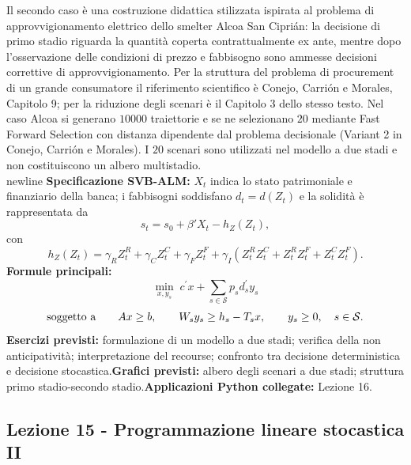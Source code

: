 \documentclass[12pt,a4paper]{article}%
\newcommand{\1}{\mathbf{1}}
\begin{document}
Il secondo caso \`e una costruzione didattica stilizzata
ispirata al problema di approvvigionamento elettrico dello smelter Alcoa
San Cipri\'{a}n: la decisione di primo stadio riguarda la quantit\`a coperta
contrattualmente ex ante, mentre dopo l'osservazione delle condizioni di
prezzo e fabbisogno sono ammesse decisioni correttive di approvvigionamento.
Per la struttura del problema di procurement di un grande consumatore il
riferimento scientifico \`e Conejo, Carri\'{o}n e Morales, Capitolo 9; per la
riduzione degli scenari \`e il Capitolo 3 dello stesso testo. Nel caso Alcoa
si generano $10000$ traiettorie e se ne selezionano $20$ mediante Fast
Forward Selection con distanza dipendente dal problema decisionale
(Variant 2 in Conejo, Carri\'{o}n e Morales). I $20$ scenari sono utilizzati
nel modello a due stadi e non costituiscono un albero multistadio.\\newline
\newline\textbf{Specificazione SVB-ALM:} $X_t$ indica lo stato patrimoniale e
finanziario della banca; i fabbisogni soddisfano $d_t=d(Z_t)$ e la solidit\`a
\`e rappresentata da
\[
s_t=s_0+\beta'X_t-h_Z(Z_t),
\]
con
\[
h_Z(Z_t)=
\gamma_R Z_t^R+\gamma_C Z_t^C+\gamma_F Z_t^F
+\gamma_I\left(
Z_t^RZ_t^C+Z_t^RZ_t^F+Z_t^CZ_t^F
\right).
\]
\newline\textbf{Formule
principali:}
\[
\min_{x,y_{s}}\; c^{\prime}x+\sum_{s\in\mathcal{S}}p_{s} d_{s}^{\prime}y_{s}
\]
\[
\hbox{soggetto a} \qquad Ax\geq b, \qquad W_{s} y_{s}\geq h_{s}-T_{s}x, \qquad
y_{s}\geq0, \quad s\in\mathcal{S}.
\]
\textbf{Esercizi previsti:} formulazione di un modello a due stadi; verifica
della non anticipativit\`{a}; interpretazione del recourse; confronto tra
decisione deterministica e decisione stocastica.\newline\textbf{Grafici
previsti:} albero degli scenari a due stadi; struttura primo stadio-secondo
stadio.\newline\textbf{Applicazioni Python collegate:} Lezione 16.

\subsection{Lezione 15 - Programmazione lineare stocastica II}
\end{document}
